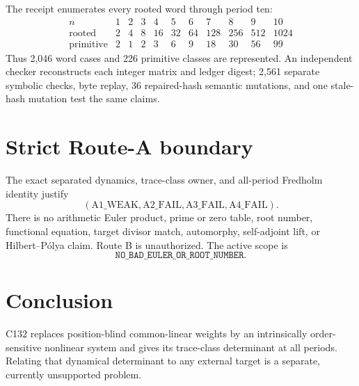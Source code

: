 \documentclass[11pt]{article}
\begin{document}
The receipt enumerates every rooted word through period ten:
\[
\begin{array}{c|rrrrrrrrrr}
 n&1&2&3&4&5&6&7&8&9&10\\ \hline
 \text{rooted}&2&4&8&16&32&64&128&256&512&1024\\
 \text{primitive}&2&1&2&3&6&9&18&30&56&99
\end{array}
\]
Thus 2,046 word cases and 226 primitive classes are represented.  An
independent checker reconstructs each integer matrix and ledger digest;
2,561 separate symbolic checks, byte replay, 36 repaired-hash semantic
mutations, and one stale-hash mutation test the same claims.

\section{Strict Route-A boundary}

The exact separated dynamics, trace-class owner, and all-period Fredholm
identity justify
\[
 (\mathrm{A1\_WEAK},\mathrm{A2\_FAIL},\mathrm{A3\_FAIL},
  \mathrm{A4\_FAIL}).
\]
There is no arithmetic Euler product, prime or zero table, root number,
functional equation, target divisor match, automorphy, self-adjoint lift, or
Hilbert--P\'olya claim.  Route B is unauthorized.  The active scope is
\[
 \texttt{NO\_BAD\_EULER\_OR\_ROOT\_NUMBER}.
\]

\section{Conclusion}

C132 replaces position-blind common-linear weights by an intrinsically
order-sensitive nonlinear system and gives its trace-class determinant at all
periods.  Relating that dynamical determinant to any external target is a
separate, currently unsupported problem.
\end{document}
